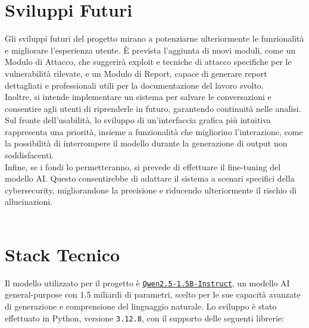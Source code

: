 \documentclass[11pt]{article}
\begin{document}
\section{Sviluppi Futuri}
Gli sviluppi futuri del progetto mirano a potenziarne ulteriormente le funzionalità e 
migliorare l’esperienza utente.
È prevista l'aggiunta di nuovi moduli, come un Modulo 
di Attacco, che suggerirà exploit e tecniche di attacco specifiche per le vulnerabilità 
rilevate, e un Modulo di Report, capace di generare report dettagliati e professionali 
utili per la documentazione del lavoro svolto.\\
Inoltre, si intende implementare un sistema per salvare le conversazioni e consentire agli 
utenti di riprenderle in futuro, garantendo continuità nelle analisi.\\
Sul fronte dell’usabilità, lo sviluppo di un’interfaccia grafica più intuitiva rappresenta 
una priorità, insieme a funzionalità che migliorino l’interazione, come la possibilità di 
interrompere il modello durante la generazione di output non soddisfacenti.\\
Infine, se i fondi lo permetteranno, si prevede di effettuare il fine-tuning del modello AI. 
Questo consentirebbe di adattare il sistema a scenari specifici della cybersecurity, 
migliorandone la precisione e riducendo ulteriormente il rischio di allucinazioni.
\\
\\
\section*{Stack Tecnico}

Il modello utilizzato per il progetto è \href{https://huggingface.co/Qwen/Qwen2.5-1.5B-Instruct}{\texttt{Qwen2.5-1.5B-Instruct}}, un modello AI general-purpose con 1.5 miliardi di parametri, scelto per le sue capacità avanzate di generazione e comprensione del linguaggio naturale. Lo sviluppo è stato effettuato in Python, versione \texttt{3.12.8}, con il supporto delle seguenti librerie:
\end{document}
